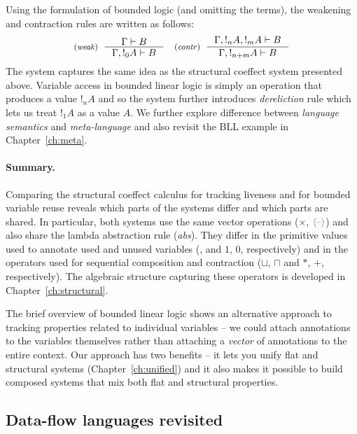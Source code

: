 Using the formulation of bounded logic (and omitting the terms), the weakening and
contraction rules are written as follows:
%
\[
\tyrule{weak}
  {\Gamma \vdash B}
  {\Gamma, !_0 A \vdash B}
\quad
\tyrule{contr}
  {\Gamma, !_n A, !_m A \vdash B}
  {\Gamma, !_{n+m} A \vdash B}
\]
%
The system captures the same idea as the structural coeffect system presented above.
Variable access in bounded linear logic is simply an operation that produces a value
$!_n A$ and so the system further introduces \emph{dereliction} rule which lets us 
treat $!_1 A$ as a value $A$. We further explore difference between \emph{language
semantics} and \emph{meta-language} and also revisit the BLL example in 
Chapter~\ref{ch:meta}.

\paragraph{Summary.}
Comparing the structural coeffect calculus for tracking liveness and for bounded variable reuse
reveals which parts of the systems differ and which parts are shared. In particular, both systems
use the same vector operations ($\times$, $\alift{\cclrd{\textnormal{--}}}$) and also share the
lambda abstraction rule (\emph{abs}). They differ in the primitive values used to annotate used
and unused variables (,  and $1$, $0$, respectively) and in the operators used
for sequential composition and contraction ($\sqcup$, $\sqcap$ and $\ast$, $+$, respectively).
The algebraic structure capturing these operators is developed in Chapter~\ref{ch:structural}.

The brief overview of bounded linear logic shows an alternative approach to tracking properties
related to individual variables -- we could attach annotations to the variables themselves 
rather than attaching a \emph{vector} of annotations to the entire context. Our approach has
two benefits -- it lets you unify flat and structural systems (Chapter~\ref{ch:unified}) and 
it also makes it possible to build composed systems that mix both flat and structural properties.



\subsection{Data-flow languages revisited}

